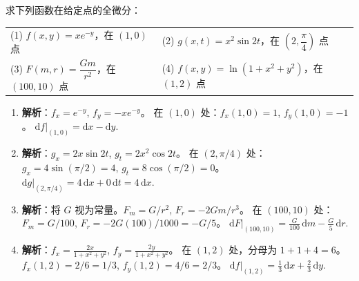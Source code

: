 \documentclass[lang=cn,11pt]{elegantbook}
\begin{document}
\begin{exercise}[指定点的全微分]
求下列函数在给定点的全微分：\\
\begin{tabular}{p{}p{}}
(1) $f(x,y) = xe^{-y}$，在 $(1,0)$ 点 & (2) $g(x,t) = x^2\sin2t$，在 $(2,\dfrac{\pi}{4})$ 点 \\
(3) $F(m,r) = \dfrac{Gm}{r^2}$，在 $(100,10)$ 点 & (4) $f(x,y) = \ln(1+x^2+y^2)$，在 $(1,2)$ 点
\end{tabular}
\end{exercise}
\begin{solution}
\begin{enumerate}
  \item[(1)] \textbf{解析}：$f_x = e^{-y}$, $f_y = -xe^{-y}$。
  在 $(1,0)$ 处：$f_x(1,0) = 1$, $f_y(1,0) = -1$。
  $\mathrm{d}f|_{(1,0)} = \mathrm{d}x - \mathrm{d}y$.
  
  \item[(2)] \textbf{解析}：$g_x = 2x\sin2t$, $g_t = 2x^2\cos2t$。
  在 $(2,\pi/4)$ 处：$g_x = 4\sin(\pi/2) = 4$, $g_t = 8\cos(\pi/2) = 0$。
  $\mathrm{d}g|_{(2,\pi/4)} = 4\,\mathrm{d}x + 0\,\mathrm{d}t = 4\,\mathrm{d}x$.
  
  \item[(3)] \textbf{解析}：将 $G$ 视为常量。$F_m = G/r^2$, $F_r = -2Gm/r^3$。
  在 $(100,10)$ 处：$F_m = G/100$, $F_r = -2G(100)/1000 = -G/5$。
  $\mathrm{d}F|_{(100,10)} = \frac{G}{100}\,\mathrm{d}m - \frac{G}{5}\,\mathrm{d}r$.
  
  \item[(4)] \textbf{解析}：$f_x = \frac{2x}{1+x^2+y^2}$, $f_y = \frac{2y}{1+x^2+y^2}$。
  在 $(1,2)$ 处，分母为 $1+1+4=6$。$f_x(1,2) = 2/6 = 1/3$, $f_y(1,2) = 4/6 = 2/3$。
  $\mathrm{d}f|_{(1,2)} = \frac{1}{3}\,\mathrm{d}x + \frac{2}{3}\,\mathrm{d}y$.
\end{enumerate}
\end{solution}
\end{document}
